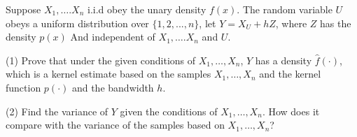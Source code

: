 \begin{problem}[HW 10.2]
Suppose $X_1,\ldots.X_n$ i.i.d obey the unary density $f(x)$. The random variable $U$ obeys a uniform distribution over $\{1,2,...,n\}$, let $Y=X_U+hZ$, where $Z$ has the density $p(x)$ And independent of $X_1,\ldots.X_n$ and $U$.

(1) Prove that under the given conditions of $X_1, \dots,X_n$, $Y$ has a density $\hat{f}(\cdot)$, which is a kernel estimate based on the samples $X_1, \dots,X_n$ and the kernel function $p(\cdot)$ and the bandwidth $h$.

(2) Find the variance of $Y$ given the conditions of $X_1, \dots,X_n$. 
How does it compare with the variance of the samples based on $X_1, \dots,X_n$?

\end{problem}

